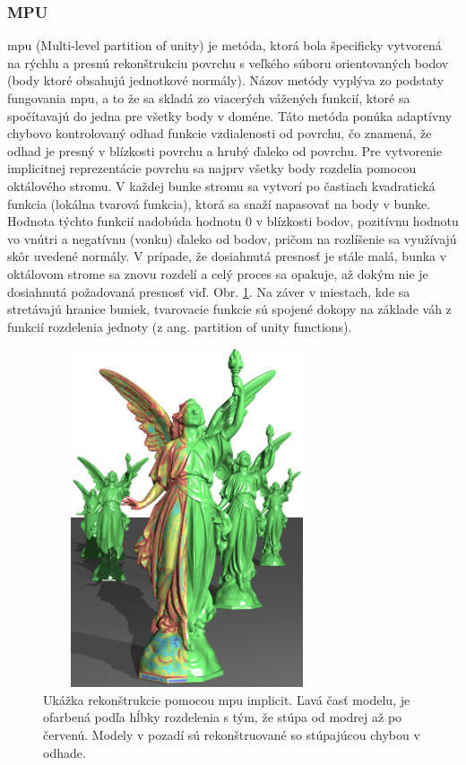 \subsubsection{MPU}
\noindent \acrshort{mpu} (Multi-level partition of unity) je metóda, ktorá bola špecificky vytvorená na rýchlu a presnú rekonštrukciu povrchu s veľkého súboru orientovaných bodov (body ktoré obsahujú jednotkové normály). Názov metódy vyplýva zo podstaty fungovania \acrshort{mpu}, a to že sa skladá zo viacerých vážených funkcií, ktoré sa spočítavajú do jedna pre všetky body v doméne. Táto metóda ponúka adaptívny chybovo kontrolovaný odhad funkcie vzdialenosti od povrchu, čo znamená, že odhad je presný v blízkosti povrchu a hrubý ďaleko od povrchu. \cite{MPU_orig}
\newline\indent Pre vytvorenie implicitnej reprezentácie povrchu sa najprv všetky body rozdelia pomocou oktálového stromu. V každej bunke stromu sa vytvorí  po častiach kvadratická funkcia (lokálna tvarová funkcia), ktorá sa snaží napasovať na body v bunke. Hodnota týchto funkcií nadobúda hodnotu 0 v blízkosti bodov, pozitívnu hodnotu vo vnútri a negatívnu (vonku) ďaleko od bodov, pričom na rozlíšenie sa využívajú skôr uvedené normály. V prípade, že dosiahnutá presnosť je stále malá, bunka v oktálovom strome sa znovu rozdelí a celý proces sa opakuje, až dokým nie je dosiahnutá požadovaná presnosť viď. Obr. \ref{fig:MPU}. Na záver v miestach, kde sa stretávajú hranice buniek, tvarovacie funkcie sú spojené dokopy na základe váh z funkcií rozdelenia jednoty (z ang. partition of unity functions). \cite{MPU_orig}
\begin{figure}[!htbp]
  \centering
  \includegraphics[width=8.5cm, height=10cm]{img/MPU_img.png}
  \caption{Ukážka rekonštrukcie pomocou \acrshort{mpu} implicit. Ľavá časť modelu, je ofarbená podľa hĺbky rozdelenia s tým, že stúpa od modrej až po červenú. Modely v pozadí sú rekonštruované so stúpajúcou chybou v odhade. \cite{MPU_orig}} 
  \label{fig:MPU}
\end{figure} 


